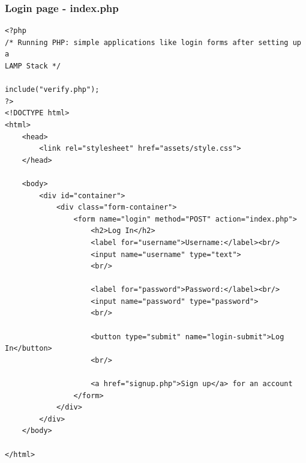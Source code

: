 \documentclass{article}
\begin{document}
\subsubsection{Login page - index.php}
\begin{verbatim}
<?php
/* Running PHP: simple applications like login forms after setting up a 
LAMP Stack */

include("verify.php");
?>
<!DOCTYPE html>
<html>
	<head>
		<link rel="stylesheet" href="assets/style.css">
	</head>
	
	<body>
		<div id="container">
			<div class="form-container">
				<form name="login" method="POST" action="index.php">
					<h2>Log In</h2>
					<label for="username">Username:</label><br/>
					<input name="username" type="text">
					<br/>

					<label for="password">Password:</label><br/>
					<input name="password" type="password">
					<br/>

					<button type="submit" name="login-submit">Log In</button>
					<br/>
						
					<a href="signup.php">Sign up</a> for an account
				</form>
			</div>
		</div>
	</body>

</html>
\end{verbatim}
\end{document}
